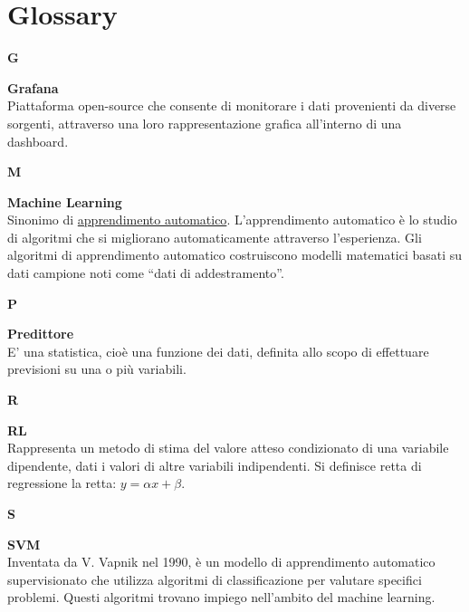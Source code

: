 \section{Glossary}

{\Large\textbf{G}\par}
\textbf{Grafana} \\
Piattaforma open-source che consente di monitorare i dati provenienti da diverse sorgenti, attraverso una loro rappresentazione grafica all'interno di una
dashboard.

{\Large\textbf{M}\par}
\textbf{Machine Learning} \\
Sinonimo di \hyperref[par:appr_auto]{apprendimento automatico}. L’apprendimento automatico è lo studio di algoritmi che si migliorano automaticamente attraverso l’esperienza. Gli algoritmi di apprendimento automatico costruiscono modelli matematici basati su dati campione noti come “dati di addestramento”.

{\Large\textbf{P}\par}
\textbf{Predittore} \\
E' una statistica, cioè una funzione dei dati, definita allo scopo di effettuare previsioni su una o più variabili.

{\Large\textbf{R}\par}
\textbf{RL} \\
Rappresenta un metodo di stima del valore atteso condizionato di una variabile dipendente, dati i valori di altre variabili indipendenti. Si definisce retta di regressione la retta: $y = \alpha x + \beta $.

{\Large\textbf{S}\par}
\textbf{SVM} \\
Inventata da V. Vapnik nel 1990, è un modello di apprendimento automatico supervisionato che utilizza algoritmi di classificazione per valutare specifici problemi. Questi algoritmi trovano impiego nell'ambito del machine learning.